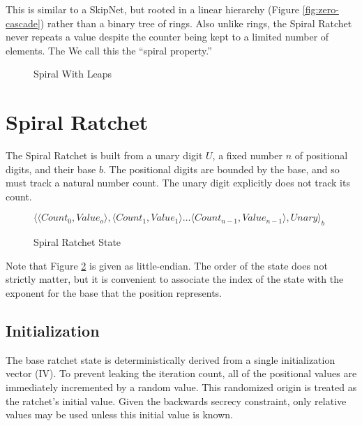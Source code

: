 \documentclass{article}
\begin{document}
	This is similar to a SkipNet\cite{skipnet}, but rooted in a linear hierarchy (Figure \ref{fig:zero-cascade}) rather than a binary tree of rings. Also unlike rings, the Spiral Ratchet never repeats a value despite the counter being kept to a limited number of elements. The  We call this the ``spiral property.''
	
	\begin{figure}[h]
		\centering
		
		
		\caption{Spiral With Leaps}
		\label{fig:spiral-metaphor}
	\end{figure}

	\FloatBarrier
	
	\section{Spiral Ratchet}
	
	The Spiral Ratchet is built from a unary digit $U$, a fixed number $n$ of positional digits, and their base $b$. The positional digits are bounded by the base, and so must track a natural number count. The unary digit explicitly does not track its count.
	
	\begin{figure}[h]
		\centering
		
		$\langle \langle Count_{0}, Value_{o} \rangle, \langle Count_{1}, Value_{1} \rangle \ldots \langle Count_{n-1}, Value_{n-1} \rangle, Unary \rangle_{b}$
		
		\caption{Spiral Ratchet State}
		\label{fig:state}
	\end{figure}

	Note that Figure \ref{fig:state} is given as little-endian. The order of the state does not strictly matter, but it is convenient to associate the index of the state with the exponent for the base that the position represents.
	
	\subsection{Initialization}
	
	The base ratchet state is deterministically derived from a single initialization vector (IV). To prevent leaking the iteration count, all of the positional values are immediately incremented by a random value. This randomized origin is treated as the ratchet's initial value. Given the backwards secrecy constraint, only relative values may be used unless this initial value is known.
	
\end{document}
